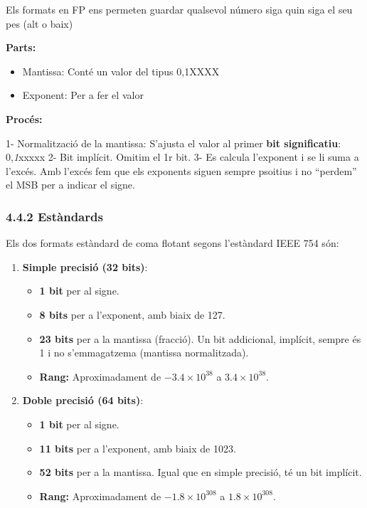 \documentclass[
  12 pt,
  a4paper,
]{article}
\providecommand{\tightlist}{%
  \setlength{\itemsep}{0pt}\setlength{\parskip}{0pt}}
\begin{document}
Els formats en FP ens permeten guardar qualsevol número siga quin siga
el seu pes (alt o baix)

\textbf{Parts:}

\begin{itemize}
\tightlist
\item
  Mantissa: Conté un valor del tipus 0,1XXXX
\item
  Exponent: Per a fer el valor
\end{itemize}

\textbf{Procés:}

1- Normalització de la mantissa: S'ajusta el valor al primer \textbf{bit
significatiu}: 0,\emph{1}xxxxx 2- Bit implícit. Omitim el 1r bit. 3- Es
calcula l'exponent i se li suma a l'excés. Amb l'excés fem que els
exponents siguen sempre psoitius i no ``perdem'' el MSB per a indicar el
signe.

\subsubsection{4.4.2 Estàndards}\label{estuxe0ndards}

Els dos formats estàndard de coma flotant segons l'estàndard IEEE 754
són:

\begin{enumerate}
\def\labelenumi{\arabic{enumi}.}
\tightlist
\item
  \textbf{Simple precisió (32 bits)}:

  \begin{itemize}
  \tightlist
  \item
    \textbf{1 bit} per al signe.
  \item
    \textbf{8 bits} per a l'exponent, amb biaix de 127.
  \item
    \textbf{23 bits} per a la mantissa (fracció). Un bit addicional,
    implícit, sempre és 1 i no s'emmagatzema (mantissa normalitzada).
  \item
    \textbf{Rang:} Aproximadament de \(-3.4 \times 10^{38}\) a
    \(3.4 \times 10^{38}\).
  \end{itemize}
\item
  \textbf{Doble precisió (64 bits)}:

  \begin{itemize}
  \tightlist
  \item
    \textbf{1 bit} per al signe.
  \item
    \textbf{11 bits} per a l'exponent, amb biaix de 1023.
  \item
    \textbf{52 bits} per a la mantissa. Igual que en simple precisió, té
    un bit implícit.
  \item
    \textbf{Rang:} Aproximadament de \(-1.8 \times 10^{308}\) a
    \(1.8 \times 10^{308}\).
  \end{itemize}
\end{enumerate}
\end{document}
